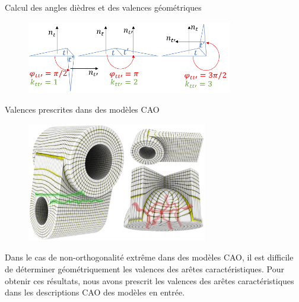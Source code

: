 \begin{frame}{Calcul des angles dièdres et des valences géométriques}

    \begin{figure}
        \centering
        \includegraphics[width=0.8\textwidth]{img/hexmeshing_ff/phi_angles.PNG}
    \end{figure}
    
\end{frame}

\begin{frame}{Valences prescrites dans des modèles CAO}

    \begin{figure}
        \centering
        \includegraphics[width=0.7\textwidth]{img/hexmeshing_ff/prescribed_valences.PNG}
    \end{figure}
    
    \small
    Dans le cas de non-orthogonalité extrême dans des modèles CAO, il est difficile de déterminer géométriquement les valences des arêtes caractéristiques. Pour obtenir ces résultats, nous avons prescrit les valences des arêtes caractéristiques dans les descriptions CAO des modèles en entrée.
    
\end{frame}